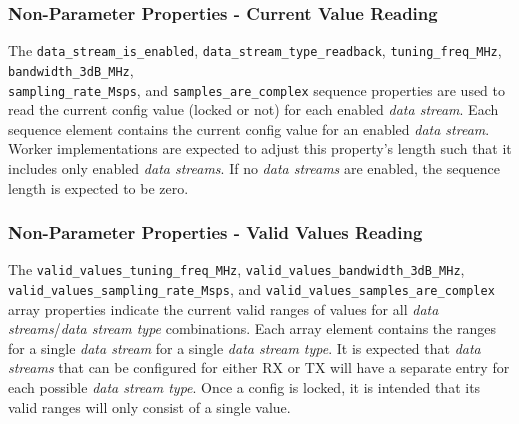 \documentclass{article}
\begin{document}
  \subsubsection{Non-Parameter Properties - Current Value Reading}
  The
  \verb+data_stream_is_enabled+,
  \verb+data_stream_type_readback+,
  \verb+tuning_freq_MHz+,
  \verb+bandwidth_3dB_MHz+, \\
  \verb+sampling_rate_Msps+, and 
  \verb+samples_are_complex+
  sequence properties are used to read the current config value
  (locked or not) for each enabled \textit{data stream}. Each
  sequence element contains the current config value for an enabled
  \textit{data stream}.
  Worker implementations are expected to adjust this property's
  length such that it includes only enabled
  \textit{data streams}.
  If no
  \textit{data streams}
  are enabled, the sequence length is expected to be zero.

  \subsubsection{Non-Parameter Properties - Valid Values Reading}
  The
  \verb+valid_values_tuning_freq_MHz+,
  \verb+valid_values_bandwidth_3dB_MHz+,
  \verb+valid_values_sampling_rate_Msps+, and
  \verb+valid_values_samples_are_complex+
  array properties indicate the current valid ranges of
  values for all \textit{data streams}/\textit{data stream type}
  combinations.
  Each array element contains the
  ranges for a single \textit{data stream} for a single
  \textit{data stream type}.
  It is expected that \textit{data streams} that can be configured for either
  RX or TX will have a separate entry for each possible
  \textit{data stream type}.
  Once a config is locked, it
  is intended that its valid ranges will only consist of a single value.
\end{document}
